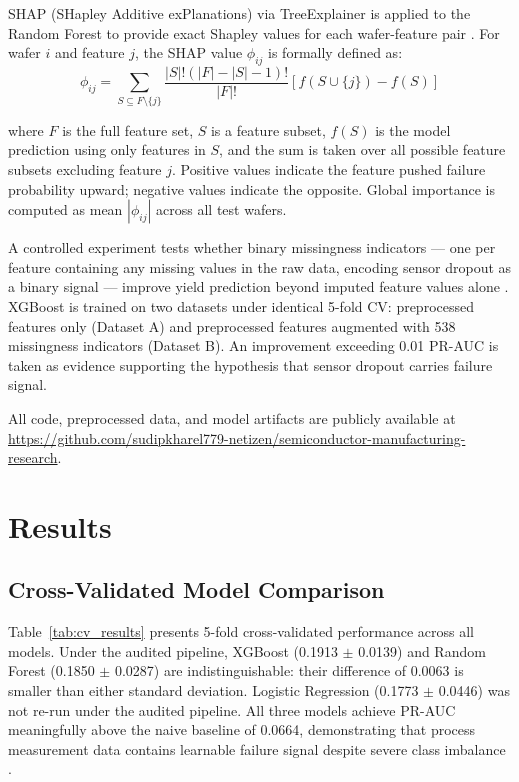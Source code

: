 \documentclass[conference]{IEEEtran}
\begin{document}
SHAP (SHapley Additive exPlanations) via TreeExplainer is applied 
to the Random Forest to provide exact Shapley values for each 
wafer-feature pair \cite{lundberg2017unified,lundberg2020local}. 
For wafer $i$ and feature $j$, the SHAP value $\phi_{ij}$ is 
formally defined as:
\begin{equation}
\phi_{ij} = \sum_{S \subseteq F \setminus \{j\}} 
\frac{|S|!(|F|-|S|-1)!}{|F|!}
[f(S \cup \{j\}) - f(S)]
\label{eq:shap}
\end{equation}

where $F$ is the full feature set, $S$ is a feature subset, 
$f(S)$ is the model prediction using only features in $S$, 
and the sum is taken over all possible feature subsets 
excluding feature $j$. Positive values indicate the feature pushed 
failure probability upward; negative values indicate the opposite. 
Global importance is computed as mean $|\phi_{ij}|$ across all test 
wafers.

A controlled experiment tests whether binary missingness indicators 
--- one per feature containing any missing values in the raw data, 
encoding sensor dropout as a binary signal --- improve yield 
prediction beyond imputed feature values alone 
\cite{boyapati2024enhancing}. XGBoost is trained on two datasets 
under identical 5-fold CV: preprocessed features only (Dataset A) 
and preprocessed features augmented with 538 missingness indicators 
(Dataset B). An improvement exceeding 0.01 PR-AUC is taken as 
evidence supporting the hypothesis that sensor dropout carries 
failure signal.

All code, preprocessed data, and model artifacts are publicly 
available at
\url{https://github.com/sudipkharel779-netizen/semiconductor-manufacturing-research}.

\section{Results}

\subsection{Cross-Validated Model Comparison}

Table~\ref{tab:cv_results} presents 5-fold cross-validated
performance across all models. Under the audited pipeline, XGBoost
(0.1913 $\pm$ 0.0139) and Random Forest (0.1850 $\pm$ 0.0287) are
indistinguishable: their difference of 0.0063 is smaller than
either standard deviation. Logistic Regression
(0.1773 $\pm$ 0.0446) was not re-run under the audited pipeline.
All three models achieve PR-AUC meaningfully above the naive
baseline of 0.0664, demonstrating that process measurement data
contains learnable failure signal despite severe class imbalance
\cite{zhao2026survey}.
\end{document}
